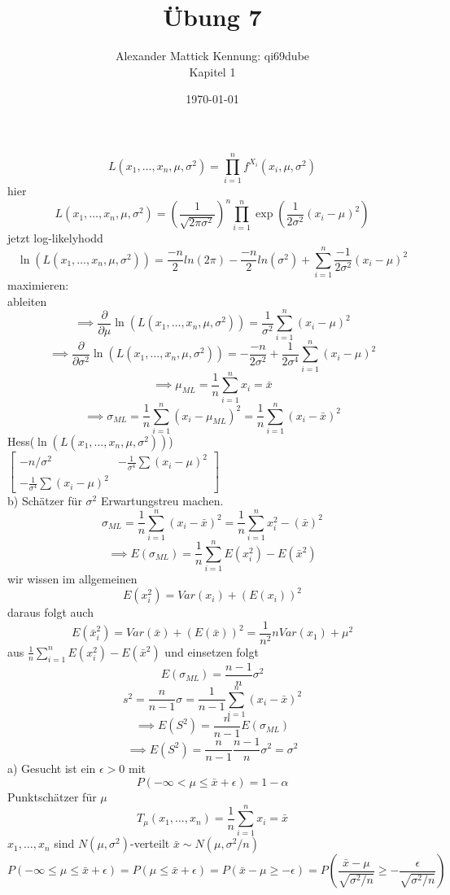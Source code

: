 \documentclass{article}
\author{
Alexander Mattick Kennung: qi69dube\\
Kapitel 1
}
\date{\today}
\title{Übung 7}
\begin{document}
	\maketitle
	\[L(x_1,\dots,x_n,\mu,\sigma^2) = \prod^n_{i=1}f^{X_i}(x_i,\mu,\sigma^2)\]
	hier
	\[L(x_1,\dots,x_n,\mu,\sigma^2) =(\frac{1}{\sqrt{2\pi\sigma^2}})^n\prod^n_{i=1}\exp(\frac{1}{2\sigma^2}(x_i-\mu)^2)\]
	jetzt log-likelyhodd
	\[\ln(L(x_1,\dots,x_n,\mu,\sigma^2)) =\frac{-n}{2}ln(2\pi)-\frac{-n}{2}ln(\sigma^2)+\sum^n_{i=1}\frac{-1}{2\sigma^2}(x_i-\mu)^2\]
	maximieren:\\
	ableiten
	\[\implies \frac{\partial}{\partial\mu} \ln(L(x_1,\dots,x_n,\mu,\sigma^2)) =\frac{1}{\sigma^2}\sum^n_{i=1}(x_i-\mu)^2\]
	\[\implies \frac{\partial}{\partial\sigma^2} \ln(L(x_1,\dots,x_n,\mu,\sigma^2)) =-\frac{-n}{2\sigma^2}+\frac{1}{2\sigma^4}\sum^n_{i=1}(x_i-\mu)^2\]
	\[\implies \mu_{ML} =\frac{1}{n}\sum^n_{i=1}x_i=\bar x\]
	\[\implies \sigma_{ML} =\frac{1}{n}\sum^n_{i=1}(x_i-\mu_{ML})^2=\frac{1}{n}\sum^n_{i=1}(x_i-\bar x)^2\]
	Hess($\ln(L(x_1,\dots,x_n,\mu,\sigma^2))$)\\
	$\begin{bmatrix} -n/\sigma^2&-\frac{1}{\sigma^4}\sum(x_i-\mu)^2\\-\frac{1}{\sigma^4}\sum(x_i-\mu)^2& \end{bmatrix}$\\
	b) Schätzer für $\sigma^2$ Erwartungstreu machen.\\
	\[\sigma_{ML} = \frac{1}{n}\sum^n_{i=1} (x_i-\bar x)^2= \frac{1}{n}\sum^n_{i=1} x_i^2-(\bar x)^2\]
	\[\implies E(\sigma_{ML}) = \frac{1}{n}\sum^n_{i=1} E(x_i^2)-E(\bar x^2) \]
	wir wissen im allgemeinen
	\[E(x_i^2) = Var(x_i)+(E(x_i))^2\]
	daraus folgt auch
	\[E(\bar x_i^2) = Var(\bar x)+(E(\bar x))^2 = \frac{1}{n^2}nVar(x_1)+\mu^2\]
	aus $ \frac{1}{n}\sum^n_{i=1} E(x_i^2)-E(\bar x^2)$ und einsetzen folgt
	\[E(\sigma_{ML}) = \frac{n-1}{n}\sigma^2\]
	\[s^2 = \frac{n}{n-1} \sigma = \frac{1}{n-1}\sum^n_{i=1}(x_i-\bar x)^2\]
	\[\implies E(S^2) = \frac{n}{n-1} E(\sigma_{ML})\]
	\[\implies E(S^2) = \frac{n}{n-1}  \frac{n-1}{n}\sigma^2 = \sigma^2\]
	a) Gesucht ist ein $\epsilon>0$ mit
	\[P(-\infty <\mu\leq \bar x+\epsilon) = 1-\alpha\]
	Punktschätzer für $\mu$
	\[T_\mu (x_1,\dots,x_n)=\frac{1}{n} \sum^n_{i=1} x_i = \bar x\]
	$x_1,\dots, x_n$ sind $N(\mu,\sigma^2)$-verteilt $\bar x\sim N(\mu,\sigma^2/n)$\\
	\[P(-\infty\leq \mu\leq \bar x+\epsilon) = P(\mu\leq \bar x+\epsilon) = P(\bar x-\mu\geq -\epsilon) = P(\frac{\bar x-\mu}{\sqrt{\sigma^2/n}}\geq -\frac{\epsilon}{\sqrt{\sigma^2/n}})\]
\end{document}

